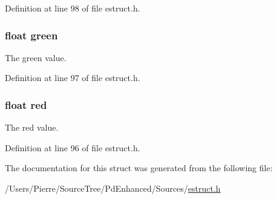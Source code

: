 Definition at line 98 of file estruct.\-h.

\hypertarget{struct__rgba_af8d69af46156237d69b44a880e4f486e}{
\subsubsection[{green}]{\setlength{\rightskip}{0pt plus 5cm}float green}}\label{struct__rgba_af8d69af46156237d69b44a880e4f486e}
The green value. 

Definition at line 97 of file estruct.\-h.

\hypertarget{struct__rgba_acddf4f34ba92c602d4205ba50e98d603}{
\subsubsection[{red}]{\setlength{\rightskip}{0pt plus 5cm}float red}}\label{struct__rgba_acddf4f34ba92c602d4205ba50e98d603}
The red value. 

Definition at line 96 of file estruct.\-h.



The documentation for this struct was generated from the following file\-:\begin{DoxyCompactItemize}
\item 
/\-Users/\-Pierre/\-Source\-Tree/\-Pd\-Enhanced/\-Sources/\hyperlink{estruct_8h}{estruct.\-h}\end{DoxyCompactItemize}
